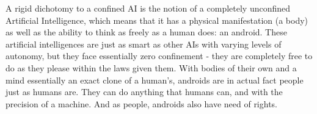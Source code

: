 A rigid dichotomy to a confined AI is the notion of a completely unconfined Artificial Intelligence, which means that it has a physical manifestation (a body) as well as the ability to think as freely as a human does: an android. These artificial intelligences are just as smart as other AIs with varying levels of autonomy, but they face essentially zero confinement - they are completely free to do as they please within the laws given them. With bodies of their own and a mind essentially an exact clone of a human's, androids are in actual fact people just as humans are. They can do anything that humans can, and with the precision of a machine. And as people, androids also have need of rights.